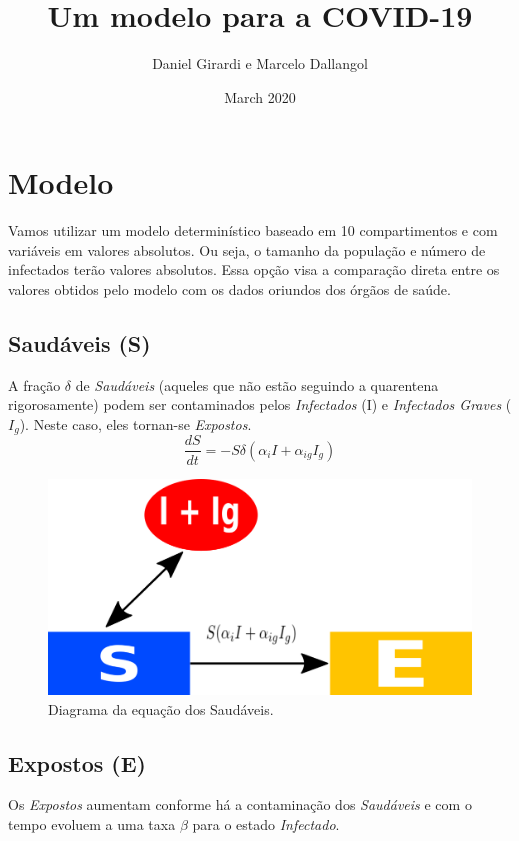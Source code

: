 \documentclass{article}
\title{Um modelo para a COVID-19}
\author{Daniel Girardi e Marcelo Dallangol}
\date{March 2020}
\begin{document}
\maketitle

\section{Modelo}
Vamos utilizar um modelo determinístico baseado em 10 compartimentos e com variáveis em valores absolutos. Ou seja, o tamanho da população e número de infectados terão valores absolutos. Essa opção visa a comparação direta entre os valores obtidos pelo modelo com os dados oriundos dos órgãos de saúde. 

\subsection{Saudáveis (S)}
A fração $\delta$ de \textit{Saudáveis} (aqueles que não estão seguindo a quarentena rigorosamente) podem ser contaminados pelos \textit{Infectados} (I) e \textit{Infectados Graves} ($I_g$). Neste caso, eles tornan-se \textit{Expostos}. 
\begin{equation}
    \frac{dS}{dt}= -S\delta(\alpha_i I +\alpha_{ig}I_g)
\end{equation}
\begin{figure}[!h]
\centering
\includegraphics[scale=0.4]{covidS}
\caption{Diagrama da equação dos Saudáveis.}
\label{fig:universe}
\end{figure}

\subsection{Expostos (E)}
Os \textit{Expostos} aumentam conforme há a contaminação dos \textit{Saudáveis} e com o tempo evoluem a uma taxa $\beta$ para o estado \textit{Infectado}.
\end{document}
